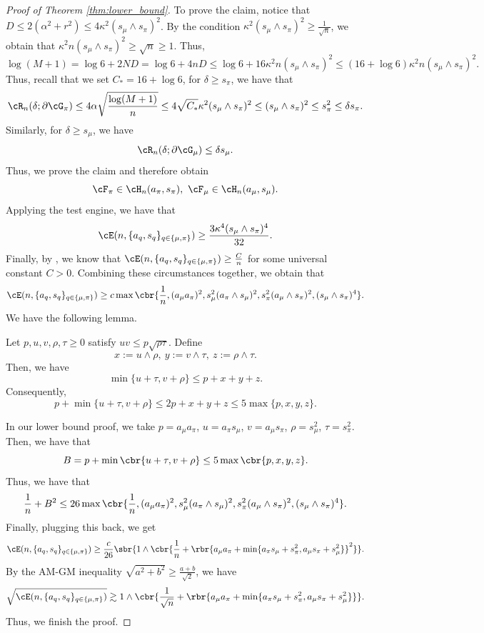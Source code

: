 \documentclass[11pt]{article}
\begin{document}
\begin{proof}[Proof of Theorem \ref{thm:lower_bound}]
To prove the claim, notice that $D\le 2(\alpha^2+r^2)\le 4\kappa^2(s_\mu\wedge s_\pi)^2$. By the condition $\kappa^2(s_\mu\wedge s_\pi)^2\ge\frac{1}{\sqrt{n}}$, we obtain that $\kappa^2n(s_\mu\wedge s_\pi)^2\ge\sqrt{n}\ge 1$. Thus,
\[
\log(M+1)=\log 6+2ND= \log 6+4nD\le \log 6+16\kappa^2n(s_{\mu}\wedge s_\pi)^2\le (16+\log 6)\kappa^2n(s_{\mu}\wedge s_\pi)^2.
\]
Thus, recall that we set $C_*=16+\log 6$, for $\delta\ge s_\pi$, we have that
\begin{align*}
    \cR_n(\delta;\partial\cG_\pi)\le 4\alpha\sqrt{\frac{\log(M+1)}{n}}\le 4\sqrt{C_*}\kappa^2(s_\mu\wedge s_\pi)^2\le (s_{\mu}\wedge s_\pi)^2\le s_\pi^2\le\delta s_\pi.
\end{align*}
Similarly, for $\delta\ge s_\mu$, we have
\[
\cR_n(\delta;\partial\cG_\mu)\le \delta s_\mu.
\]
Thus, we prove the claim and therefore obtain
\[
\cF_\pi\in\cH_n(a_\pi,s_\pi),\ \cF_\mu\in\cH_n(a_\mu,s_\mu).
\]
Applying the test engine, we have that 
\[
\cE(n,\{a_q,s_q\}_{q\in\{\mu,\pi\}})\ge \frac{3\kappa^4(s_\mu\wedge s_\pi)^4}{32}.
\]
Finally, by \citet{balakrishnan2026fundamental}, we know that $\cE(n,\{a_q,s_q\}_{q\in\{\mu,\pi\}})\ge \frac{C}{n}$ for some universal constant $C>0$. Combining these circumstances together, we obtain that
\[
\cE(n,\{a_q,s_q\}_{q\in\{\mu,\pi\}})\ge c\max\cbr{\frac{1}{n},(a_\mu a_\pi)^2,s_\mu^2(a_\pi\wedge s_\mu)^2,s_\pi^2(a_\mu\wedge s_\pi)^2,(s_\mu\wedge s_\pi)^4}.
\]
We have the following lemma.
\begin{lemma}
\label{lem:two-sided-truncation}
Let \(p,u,v,\rho,\tau\ge 0\) satisfy $uv\le p\sqrt{\rho\tau}$.
Define
\[
x:=u\wedge\rho,
\ 
y:=v\wedge\tau,
\ 
z:=\rho\wedge\tau.
\]
Then, we have
\[
\min\{u+\tau,v+\rho\}
\le p+x+y+z.
\]
Consequently,
\[
p+\min\{u+\tau,v+\rho\}
\le 2p+x+y+z
\le 5\max\{p,x,y,z\}.
\]
\end{lemma}
In our lower bound proof, we take $p=a_\mu a_\pi$, $u=a_\pi s_\mu$, $v=a_\mu s_\pi$, $\rho=s_\mu^2$, $\tau=s_\pi^2$. Then, we have that
\[
B=p+\min\cbr{u+\tau,v+\rho}\le 5\max\cbr{p,x,y,z}.
\]
Thus, we have that
\[
\frac{1}{n}+B^2\le 26\max\cbr{\frac{1}{n},(a_\mu a_\pi)^2,s_\mu^2(a_\pi\wedge s_\mu)^2,s_\pi^2(a_\mu\wedge s_\pi)^2,(s_\mu\wedge s_\pi)^4}.
\]
Finally, plugging this back, we get
\[
\cE(n,\{a_q,s_q\}_{q\in\{\mu,\pi\}})\ge \frac{c}{26}\sbr{1\wedge\cbr{\frac{1}{n}+\rbr{a_{\mu}a_\pi+\min\{a_{\pi}s_\mu+s_\pi^2,a_\mu s_\pi+s_\mu^2\}}^2}}.
\]
By the AM-GM inequality $\sqrt{a^2+b^2}\ge\frac{a+b}{\sqrt{2}}$, we have 
\[
\sqrt{\cE(n,\{a_q,s_q\}_{q\in\{\mu,\pi\}})}\gtrsim 1\wedge\cbr{\frac{1}{\sqrt{n}}+\rbr{a_{\mu}a_\pi+\min\{a_{\pi}s_\mu+s_\pi^2,a_\mu s_\pi+s_\mu^2\}}}.
\]
Thus, we finish the proof.
\end{proof}
\end{document}
